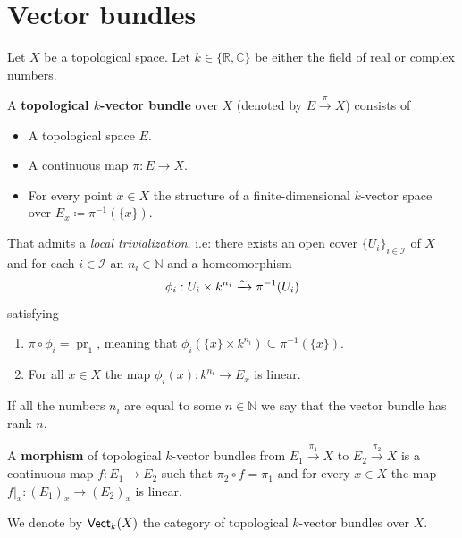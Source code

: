 \documentclass[../../../main]{subfiles}
\begin{document}
\section{Vector bundles}\label{sec:vector-bundles}

\begin{definition}\label{def:topological-vector-bundle}
  Let \(X\) be a topological space.
  Let \(k \in \{\mathbb{R}, \mathbb{C}\}\) be either the field of real or complex numbers.
 
  A \textbf{topological \(k\)-vector bundle} over \(X\) (denoted by \(E \xrightarrow{\pi} X\)) consists of
  \begin{itemize}
    \item A topological space \(E\).
    \item A continuous map \(\pi: E \to X\).
    \item For every point \(x \in X\) the structure of a finite-dimensional \(k\)-vector space over \(E_{x} \coloneq \pi^{-1}(\{x\})\).
  \end{itemize}
  That admits a \textit{local trivialization}, i.e: there exists an open cover \(\{U_{i}\}_{i \in \mathcal{I}}\) of \(X\) and for each \(i \in \mathcal{I}\) an \(n_{i} \in \mathbb{N}\) and a homeomorphism
  \begin{equation*}
    \phi_{i}: U_{i} \times k^{n_{i}} \xrightarrow{\sim} \pi^{-1}(U_{i})
  \end{equation*}
  satisfying
  \begin{enumerate}
    \item \(\pi \circ \phi_{i} = \operatorname{pr}_{1}\), meaning that \(\phi_{i}(\{x\} \times k^{n_{i}}) \subseteq \pi^{-1}(\{x\})\).
    \item For all \(x \in X\) the map \(\phi_{i}(x): k^{n_{i}} \to E_{x}\) is linear.
  \end{enumerate}
  If all the numbers \(n_{i}\) are equal to some \(n \in \mathbb{N}\) we say that the vector bundle has rank \(n\).
  
  A \textbf{morphism} of topological \(k\)-vector bundles from \(E_{1} \xrightarrow{\pi_{1}} X\) to \(E_{2} \xrightarrow{\pi_{2}} X\) is a continuous map \(f: E_{1} \to E_{2}\) such that \(\pi_{2} \circ f = \pi_{1}\) and for every \(x \in X\) the map \(f|_{x}: (E_{1})_{x} \to (E_{2})_{x}\) is linear.

  We denote by \(\mathsf{Vect}_{k}(X)\) the category of topological \(k\)-vector bundles over \(X\).
\end{definition}
\end{document}
